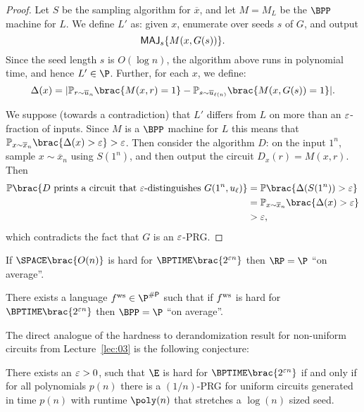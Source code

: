 \begin{proof}
	Let $S$ be the sampling algorithm for $\overline{x}$, and let $M = M_L$
	be the $\BPP$ machine for $L$. We define $L'$ as: given $x$, enumerate
	over seeds $s$ of $G$, and output
	\[ \textsf{MAJ}_{s} \{M(x, G(s)) \}. \]
	Since the seed length $s$ is $O(\log n)$, the algorithm above runs in
	polynomial time, and hence $L' \in \P$.
	Further, for each $x$, we define:
	\[
		\Delta(x) = \card{
			\Pr_{r \sim \overline{u}_n}         \brac{ M(x, r) = 1}
                  - \Pr_{s \sim \overline{u}_{\ell(n)}} \brac{ M(x, G(s)) = 1}
		  }.
	\]

	We suppose (towards a contradiction) that $L'$ differs from $L$ on more
	than an $\varepsilon$-fraction of inputs. Since $M$ is a $\BPP$ machine for $L$
	this means that
	$\Pr_{x \sim \overline{x}_n}\brac{\Delta(x) > \eps} > \eps$. Then consider
	the algorithm $D$: on the input $1^n$, sample $x \sim \overline{x}_n$ using
	$S(1^n)$, and then output the circuit $D_x(r) = M(x, r)$.
	Then
  \begin{align*}
		\Pr\brac{D \text{ prints a circuit that } \eps \text{-distinguishes } G(1^n, u_{\ell})}
    &= \Pr\brac{\Delta(S(1^n)) > \eps}\\
    &= \Pr_{x \sim \overline{x}_n}\brac{\Delta(x) > \eps}\\
    &> \eps,
  \end{align*}
	which contradicts the fact that $G$ is an $\varepsilon$-PRG.
\end{proof}


\begin{theorem}
	If
	$\SPACE\brac{O(n)}$ is hard for $\BPTIME\brac{2^{\eps n}}$
	then
	$\RP = \P$ ``on average''.
\end{theorem}


\begin{theorem}
	There exists a language $\fws \in \P^{\sharpp}$ such that if $ f^{\text{ws}} $
	is hard for $\BPTIME\brac{2^{\eps n}}$ then
	$\BPP = \P$ ``on average''.
\end{theorem}

The direct analogue of the hardness to derandomization result for non-uniform
circuits from Lecture~\ref{lec:03} is the following conjecture:

\begin{conjecture}
	There exists an $\varepsilon > 0$, such that $\E$ is hard for
	$\BPTIME\brac{2^{\eps n}}$ if and only if for all polynomials $p(n)$ there
	is a $(1 / n)$-PRG for uniform circuits generated in time $p(n)$ with
	runtime $\poly(n)$ that stretches a $\log(n)$ sized seed.
\end{conjecture}


